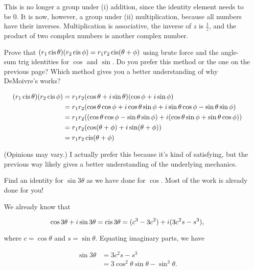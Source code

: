 \documentclass[../key.tex]{subfiles}
\begin{document}
This is no longer a group under (i) addition, since the identity element needs to be $0$. It is now, however, a group under (ii) multiplication, because all numbers have their inverses. Multiplication is associative, the inverse of $z$ is $\frac{1}{z}$, and the product of two complex numbers is another complex number.

\begin{outer_problem}
\item Prove that $(r_1\operatorname{cis} \theta)(r_2\operatorname{cis} \phi) = r_1r_2 \operatorname{cis}(\theta + \phi)$ using brute force and the angle-sum trig identities for $\cos$ and $\sin$. Do you prefer this method or the one on the previous page? Which method gives you a better understanding of why DeMoivre's works?
\end{outer_problem}

\begin{align*}
(r_1\operatorname{cis} \theta)(r_2\operatorname{cis} \phi) &= r_1r_2(\cos \theta + i\sin \theta)(\cos \phi + i\sin \phi) \\
&= r_1r_2(\cos\theta\cos\phi + i\cos\theta\sin\phi + i\sin\theta\cos\phi - \sin\theta\sin\phi) \\
&= r_1r_2((\cos\theta\cos\phi - \sin\theta\sin\phi) + i(\cos\theta\sin\phi+\sin\theta\cos\phi)) \\
&= r_1r_2(\cos(\theta+\phi) + i\sin(\theta + \phi)) \\
&= r_1r_2\operatorname{cis}(\theta + \phi)
\end{align*}

(Opinions may vary.) I actually prefer this because it's kind of satisfying, but the previous way likely gives a better understanding of the underlying mechanics.

\begin{outer_problem}
\item Find an identity for $\sin 3\theta$ as we have done for $\cos$. Most of the work is already done for you!
\end{outer_problem}

We already know that

$$\cos 3\theta + i\sin 3\theta = \operatorname{cis} 3\theta = (c^3 - 3c^2) + i (3c^2 s - s^3),$$

where $c=\cos\theta$ and $s=\sin\theta$. Equating imaginary parts, we have

\begin{align*}
\sin 3\theta &= 3c^2 s - s^3 \\
&= 3\cos^2\theta\sin\theta - \sin^3\theta.
\end{align*}
\end{document}
